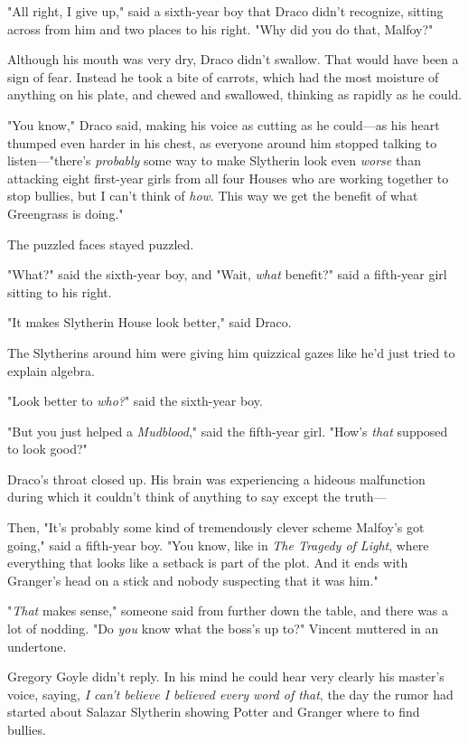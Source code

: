 "All right, I give up," said a sixth-year boy that Draco didn't recognize,
sitting across from him and two places to his right. "Why did you do that,
Malfoy?"

Although his mouth was very dry, Draco didn't swallow. That would have been a
sign of fear. Instead he took a bite of carrots, which had the most moisture of
anything on his plate, and chewed and swallowed, thinking as rapidly as he
could.

"You know," Draco said, making his voice as cutting as he could---as his heart
thumped even harder in his chest, as everyone around him stopped talking to
listen\mbox{---}"there's \emph{probably} some way to make Slytherin look even
\emph{worse} than attacking eight first-year girls from all four Houses who are
working together to stop bullies, but I can't think of \emph{how}. This way we
get the benefit of what Greengrass is doing."

The puzzled faces stayed puzzled.

"What?" said the sixth-year boy, and "Wait, \emph{what} benefit?" said a
fifth-year girl sitting to his right.

"It makes Slytherin House look better," said Draco.

The Slytherins around him were giving him quizzical gazes like he'd just tried
to explain algebra.

"Look better to \emph{who?}" said the sixth-year boy.

"But you just helped a \emph{Mudblood}," said the fifth-year girl. "How's
\emph{that} supposed to look good?"

Draco's throat closed up. His brain was experiencing a hideous malfunction
during which it couldn't think of anything to say except the truth---

Then, "It's probably some kind of tremendously clever scheme Malfoy's got
going," said a fifth-year boy. "You know, like in \emph{The Tragedy of Light},
where everything that looks like a setback is part of the plot. And it ends
with Granger's head on a stick and nobody suspecting that it was him."

"\emph{That} makes sense," someone said from further down the table, and there
was a lot of nodding.
\sbreak
"Do \emph{you} know what the boss's up to?" Vincent muttered in an undertone.

Gregory Goyle didn't reply. In his mind he could hear very clearly his master's
voice, saying, \emph{I can't believe I believed every word of that}, the day
the rumor had started about Salazar Slytherin showing Potter and Granger where
to find bullies.

